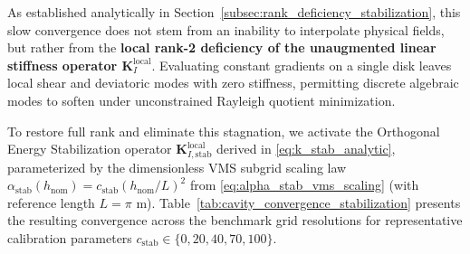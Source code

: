 \documentclass[VANCOUVER,Times1COL]{WileyNJD-v5}
\begin{document}
As established analytically in Section~\ref{subsec:rank_deficiency_stabilization}, this slow convergence does not stem from an inability to interpolate physical fields, but rather from the \textbf{local rank-2 deficiency of the unaugmented linear stiffness operator $\mathbf{K}_I^{\mathrm{local}}$}. Evaluating constant gradients on a single disk leaves local shear and deviatoric modes with zero stiffness, permitting discrete algebraic modes to soften under unconstrained Rayleigh quotient minimization.

To restore full rank and eliminate this stagnation, we activate the Orthogonal Energy Stabilization operator $\mathbf{K}_{I, \mathrm{stab}}^{\mathrm{local}}$ derived in \eqref{eq:k_stab_analytic}, parameterized by the dimensionless VMS subgrid scaling law $\alpha_{\mathrm{stab}}(h_{\mathrm{nom}}) = c_{\mathrm{stab}} (h_{\mathrm{nom}}/L)^2$ from \eqref{eq:alpha_stab_vms_scaling} (with reference length $L = \pi\text{ m}$). Table~\ref{tab:cavity_convergence_stabilization} presents the resulting convergence across the benchmark grid resolutions for representative calibration parameters $c_{\mathrm{stab}} \in \{0, 20, 40, 70, 100\}$.
\end{document}
